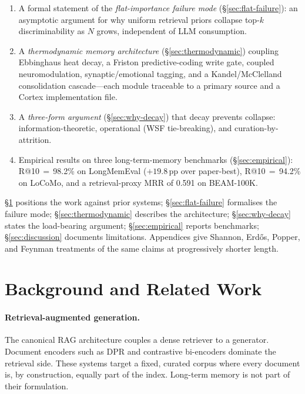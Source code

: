 \documentclass[11pt]{article}
\begin{document}
\begin{enumerate}
  \item A formal statement of the \emph{flat-importance failure
        mode} (\S\ref{sec:flat-failure}): an asymptotic argument
        for why uniform retrieval priors collapse top-$k$
        discriminability as $N$ grows, independent of LLM
        consumption.
  \item A \emph{thermodynamic memory architecture}
        (\S\ref{sec:thermodynamic}) coupling Ebbinghaus heat decay,
        a Friston predictive-coding write gate, coupled
        neuromodulation, synaptic/emotional tagging, and a
        Kandel/McClelland consolidation cascade---each module
        traceable to a primary source and a Cortex implementation
        file.
  \item A \emph{three-form argument} (\S\ref{sec:why-decay}) that
        decay prevents collapse: information-theoretic, operational
        (WSF tie-breaking), and curation-by-attrition.
  \item Empirical results on three long-term-memory benchmarks
        (\S\ref{sec:empirical}): R@10\,$=$\,98.2\% on LongMemEval
        ($+19.8$\,pp over paper-best), R@10\,$=$\,94.2\% on LoCoMo,
        and a retrieval-proxy MRR of 0.591 on BEAM-100K.
\end{enumerate}

\S\ref{sec:related} positions the work against prior systems;
\S\ref{sec:flat-failure} formalises the failure mode;
\S\ref{sec:thermodynamic} describes the architecture;
\S\ref{sec:why-decay} states the load-bearing argument;
\S\ref{sec:empirical} reports benchmarks;
\S\ref{sec:discussion} documents limitations.  Appendices give
Shannon, Erd\H{o}s, Popper, and Feynman treatments of the same
claims at progressively shorter length.

\section{Background and Related Work}
\label{sec:related}

\paragraph{Retrieval-augmented generation.}
The canonical RAG architecture \citep{Lewis2020} couples a dense
retriever to a generator.  Document encoders such as DPR
\citep{Karpukhin2020} and contrastive bi-encoders dominate the
retrieval side.  These systems target a fixed, curated corpus where
every document is, by construction, equally part of the index.
Long-term memory is not part of their formulation.
\end{document}
